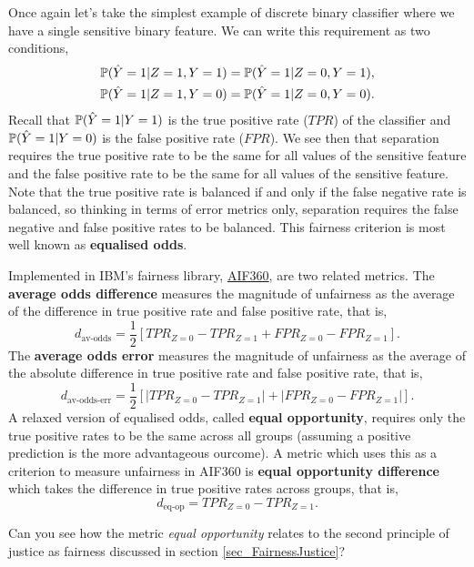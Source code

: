 Once again let's take the simplest example of discrete binary classifier where we have a single sensitive binary feature. We can write this requirement as two conditions,
\begin{align*}
\mathbb{P}(\hat{Y}=1 | Z=1, Y=1) & = \mathbb{P}(\hat{Y}=1 | Z=0, Y=1), \\
\mathbb{P}(\hat{Y}=1 | Z=1, Y=0) & = \mathbb{P}(\hat{Y}=1 | Z=0, Y=0).
\end{align*}
Recall that $\mathbb{P}(\hat{Y}=1 | Y=1)$ is the true positive rate ($TPR$) of the classifier and $\mathbb{P}(\hat{Y}=1 | Y=0)$ is the false positive rate ($FPR$). We see then that separation requires the true positive rate to be the same for all values of the sensitive feature and the false positive rate to be the same for all values of the sensitive feature. Note that the true positive rate is balanced if and only if the false negative rate is balanced, so thinking in terms of error metrics only, separation requires the false negative and false positive rates to be balanced. This fairness criterion is most well known as \textbf{equalised odds}\cite{EqOfOp}.

Implemented in IBM's fairness library, \href{https://github.com/IBM/AIF360}{AIF360}, are two related metrics. The \textbf{average odds difference} measures the magnitude of unfairness as the average of the difference in true positive rate and false positive rate, that is,
\[
d_{\text{av-odds}} = \frac{1}{2}
[ TPR_{Z=0} - TPR_{Z=1} + FPR_{Z=0} - FPR_{Z=1} ].
\]
The \textbf{average odds error} measures the magnitude of unfairness  as the average of the absolute difference in true positive rate and false positive rate, that is,
\[
d_{\text{av-odds-err}} = \frac{1}{2}
[ |TPR_{Z=0} - TPR_{Z=1}| + |FPR_{Z=0} - FPR_{Z=1}| ].
\]
A relaxed version of equalised odds, called \textbf{equal opportunity}\cite{EqOfOp}, requires only the true positive rates to be the same across all groups (assuming a positive prediction is the more advantageous ourcome). A metric which uses this as a criterion to measure unfairness in AIF360 is \textbf{equal opportunity difference} which takes the difference in true positive rates across groups, that is,
\[
d_{\text{eq-op}} = TPR_{Z=0} - TPR_{Z=1}.
\]

\begin{lookbox}
Can you see how the metric \emph{equal opportunity} relates to the second principle of justice as fairness discussed in section \ref{sec_FairnessJustice}?
\end{lookbox}

